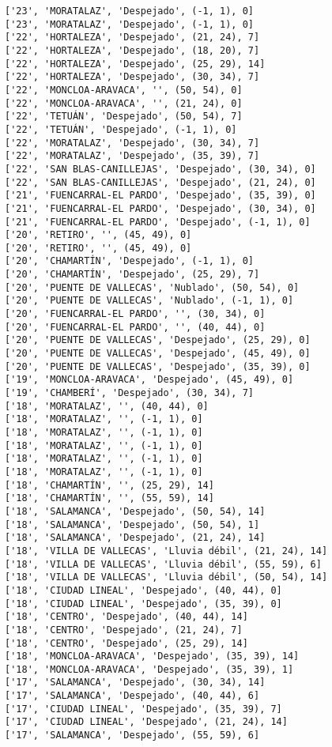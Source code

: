 \documentclass[11pt]{article}
\begin{document}
\begin{Verbatim}[commandchars=\\\{\}]
['23', 'MORATALAZ', 'Despejado', (-1, 1), 0]
['23', 'MORATALAZ', 'Despejado', (-1, 1), 0]
['22', 'HORTALEZA', 'Despejado', (21, 24), 7]
['22', 'HORTALEZA', 'Despejado', (18, 20), 7]
['22', 'HORTALEZA', 'Despejado', (25, 29), 14]
['22', 'HORTALEZA', 'Despejado', (30, 34), 7]
['22', 'MONCLOA-ARAVACA', '', (50, 54), 0]
['22', 'MONCLOA-ARAVACA', '', (21, 24), 0]
['22', 'TETUÁN', 'Despejado', (50, 54), 7]
['22', 'TETUÁN', 'Despejado', (-1, 1), 0]
['22', 'MORATALAZ', 'Despejado', (30, 34), 7]
['22', 'MORATALAZ', 'Despejado', (35, 39), 7]
['22', 'SAN BLAS-CANILLEJAS', 'Despejado', (30, 34), 0]
['22', 'SAN BLAS-CANILLEJAS', 'Despejado', (21, 24), 0]
['21', 'FUENCARRAL-EL PARDO', 'Despejado', (35, 39), 0]
['21', 'FUENCARRAL-EL PARDO', 'Despejado', (30, 34), 0]
['21', 'FUENCARRAL-EL PARDO', 'Despejado', (-1, 1), 0]
['20', 'RETIRO', '', (45, 49), 0]
['20', 'RETIRO', '', (45, 49), 0]
['20', 'CHAMARTÍN', 'Despejado', (-1, 1), 0]
['20', 'CHAMARTÍN', 'Despejado', (25, 29), 7]
['20', 'PUENTE DE VALLECAS', 'Nublado', (50, 54), 0]
['20', 'PUENTE DE VALLECAS', 'Nublado', (-1, 1), 0]
['20', 'FUENCARRAL-EL PARDO', '', (30, 34), 0]
['20', 'FUENCARRAL-EL PARDO', '', (40, 44), 0]
['20', 'PUENTE DE VALLECAS', 'Despejado', (25, 29), 0]
['20', 'PUENTE DE VALLECAS', 'Despejado', (45, 49), 0]
['20', 'PUENTE DE VALLECAS', 'Despejado', (35, 39), 0]
['19', 'MONCLOA-ARAVACA', 'Despejado', (45, 49), 0]
['19', 'CHAMBERÍ', 'Despejado', (30, 34), 7]
['18', 'MORATALAZ', '', (40, 44), 0]
['18', 'MORATALAZ', '', (-1, 1), 0]
['18', 'MORATALAZ', '', (-1, 1), 0]
['18', 'MORATALAZ', '', (-1, 1), 0]
['18', 'MORATALAZ', '', (-1, 1), 0]
['18', 'MORATALAZ', '', (-1, 1), 0]
['18', 'CHAMARTÍN', '', (25, 29), 14]
['18', 'CHAMARTÍN', '', (55, 59), 14]
['18', 'SALAMANCA', 'Despejado', (50, 54), 14]
['18', 'SALAMANCA', 'Despejado', (50, 54), 1]
['18', 'SALAMANCA', 'Despejado', (21, 24), 14]
['18', 'VILLA DE VALLECAS', 'Lluvia débil', (21, 24), 14]
['18', 'VILLA DE VALLECAS', 'Lluvia débil', (55, 59), 6]
['18', 'VILLA DE VALLECAS', 'Lluvia débil', (50, 54), 14]
['18', 'CIUDAD LINEAL', 'Despejado', (40, 44), 0]
['18', 'CIUDAD LINEAL', 'Despejado', (35, 39), 0]
['18', 'CENTRO', 'Despejado', (40, 44), 14]
['18', 'CENTRO', 'Despejado', (21, 24), 7]
['18', 'CENTRO', 'Despejado', (25, 29), 14]
['18', 'MONCLOA-ARAVACA', 'Despejado', (35, 39), 14]
['18', 'MONCLOA-ARAVACA', 'Despejado', (35, 39), 1]
['17', 'SALAMANCA', 'Despejado', (30, 34), 14]
['17', 'SALAMANCA', 'Despejado', (40, 44), 6]
['17', 'CIUDAD LINEAL', 'Despejado', (35, 39), 7]
['17', 'CIUDAD LINEAL', 'Despejado', (21, 24), 14]
['17', 'SALAMANCA', 'Despejado', (55, 59), 6]

\end{Verbatim}
\end{document}

